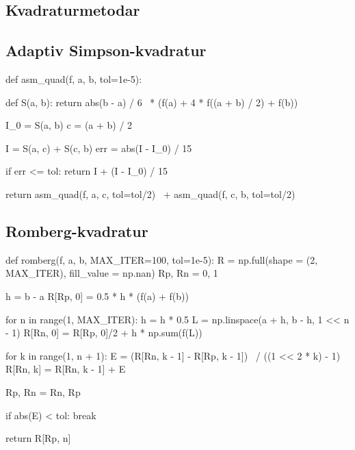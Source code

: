 \documentclass[12pt]{article}
\begin{document}
\begin{multicols*}{2}

    \section{Kvadraturmetodar}


    \subsection{Adaptiv Simpson-kvadratur}
\begin{python}[caption={Adaptiv Simpson-kvadratur}]
def asm_quad(f, a, b, tol=1e-5):

    def S(a, b):
        return abs(b - a) / 6 \
             * (f(a) + 4 * f((a + b) / 2) + f(b))

    I_0 = S(a, b)
    c = (a + b) / 2

    I = S(a, c) + S(c, b)
    err = abs(I - I_0) / 15

    if err <= tol:
        return I + (I - I_0) / 15

    return asm_quad(f, a, c, tol=tol/2) \
         + asm_quad(f, c, b, tol=tol/2)
\end{python}


    \subsection{Romberg-kvadratur}

\begin{python}[caption={Adaptiv Simpson-kvadratur}]
def romberg(f, a, b, MAX_ITER=100, tol=1e-5):
    R = np.full(shape = (2, MAX_ITER),
                fill_value = np.nan)
    Rp, Rn = 0, 1

    h = b - a
    R[Rp, 0] = 0.5 * h * (f(a) + f(b))

    for n in range(1, MAX_ITER):
        h = h * 0.5
        L = np.linspace(a + h, b - h, 1 << n - 1)
        R[Rn, 0] = R[Rp, 0]/2 + h * np.sum(f(L))

        for k in range(1, n + 1):
            E = (R[Rn, k - 1] - R[Rp, k - 1]) \
              / ((1 << 2 * k) - 1)
            R[Rn, k] = R[Rn, k - 1] + E

        Rp, Rn = Rn, Rp

        if abs(E) < tol:
            break

    return R[Rp, n]
\end{python}






\end{multicols*}
\end{document}
